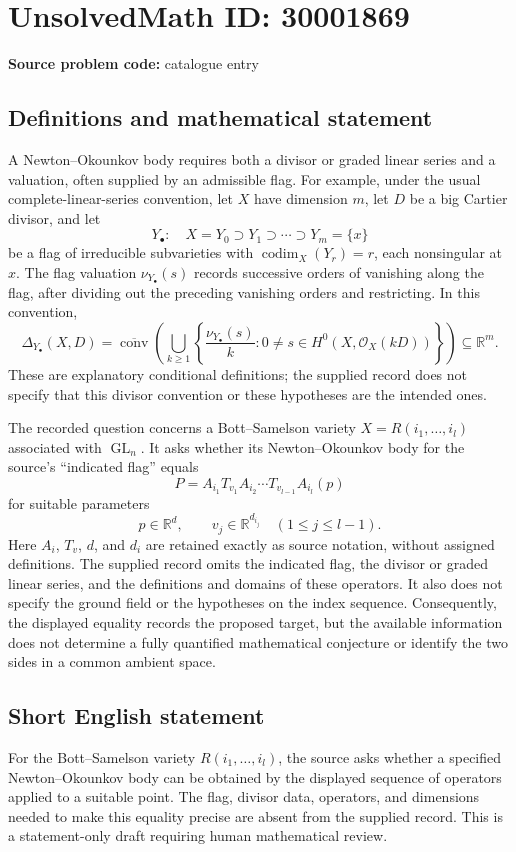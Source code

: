 \documentclass[11pt]{article}
\newcommand{\R}{\mathbb{R}}
\begin{document}
\section*{UnsolvedMath ID: 30001869}
\textbf{Source problem code:} catalogue entry
\subsection{Definitions and mathematical statement}
A Newton--Okounkov body requires both a divisor or graded linear series and a valuation, often supplied by an admissible flag. For example, under the usual complete-linear-series convention, let \(X\) have dimension \(m\), let \(D\) be a big Cartier divisor, and let
\[
Y_\bullet:\quad X=Y_0\supset Y_1\supset\cdots\supset Y_m=\{x\}
\]
be a flag of irreducible subvarieties with \(\operatorname{codim}_X(Y_r)=r\), each nonsingular at \(x\). The flag valuation \(\nu_{Y_\bullet}(s)\) records successive orders of vanishing along the flag, after dividing out the preceding vanishing orders and restricting. In this convention,
\[
\Delta_{Y_\bullet}(X,D)
=\overline{\operatorname{conv}}\left(
\bigcup_{k\geq 1}
\left\{\frac{\nu_{Y_\bullet}(s)}{k}:0\ne s\in H^0(X,\mathcal O_X(kD))\right\}
\right)\subseteq\R^m.
\]
These are explanatory conditional definitions; the supplied record does not specify that this divisor convention or these hypotheses are the intended ones.

The recorded question concerns a Bott--Samelson variety \(X=R(i_1,\ldots,i_l)\) associated with \(\operatorname{GL}_n\). It asks whether its Newton--Okounkov body for the source's ``indicated flag'' equals
\[
P=A_{i_1}T_{v_1}A_{i_2}\cdots T_{v_{l-1}}A_{i_l}(p)
\]
for suitable parameters
\[
p\in\R^d,\qquad v_j\in\R^{d_{i_j}}\quad(1\leq j\leq l-1).
\]
Here \(A_i\), \(T_v\), \(d\), and \(d_i\) are retained exactly as source notation, without assigned definitions. The supplied record omits the indicated flag, the divisor or graded linear series, and the definitions and domains of these operators. It also does not specify the ground field or the hypotheses on the index sequence. Consequently, the displayed equality records the proposed target, but the available information does not determine a fully quantified mathematical conjecture or identify the two sides in a common ambient space.
\subsection{Short English statement}
For the Bott--Samelson variety \(R(i_1,\ldots,i_l)\), the source asks whether a specified Newton--Okounkov body can be obtained by the displayed sequence of operators applied to a suitable point. The flag, divisor data, operators, and dimensions needed to make this equality precise are absent from the supplied record. This is a statement-only draft requiring human mathematical review.
\end{document}
